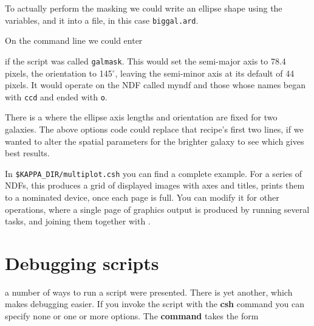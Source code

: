\documentclass[twoside,11pt,nolof]{starlink}
\providecommand{\dgs}{\hbox{$^\circ$}}
\providecommand{\PSMERGEref}{\xref{{\footnotesize PSMERGE}}{sun164}{}}
\begin{document}
To actually perform the masking we could write an  ellipse shape using the variables, and
 it into a
file, in this case \texttt{biggal.ard}.

\begin{small}
\end{small}

On the command line we could enter

\begin{small}
\begin{terminalv}
\end{terminalv}
\end{small}
if the script was called \texttt{galmask}.  This would set the semi-major
axis to 78.4 pixels, the orientation to 145\dgs, leaving the
semi-minor axis at its default of 44 pixels.  It would operate on
the NDF called myndf and those whose names began with \texttt{ccd} and
ended with \texttt{o}.

There is a   where the ellipse axis lengths and
orientation are fixed for two galaxies.  The above options code could
replace that recipe's first two lines, if we wanted to alter the
spatial parameters for the brighter galaxy to see which gives best
results.

In \texttt{\$KAPPA\_DIR/multiplot.csh} you can find a complete example.
For a series of NDFs, this produces a grid of displayed images with
axes and titles, prints them to a nominated device, once each page is
full.  You can modify it for other operations, where a single page of
graphics output is produced by running several tasks, and joining them
together with \PSMERGEref\latex{ (SUN/164)}.

\newpage
\section{Debugging scripts
\label{sc4_se_debugging}}

  a number of ways to run a
script were presented.  There is yet another, which makes debugging
easier.  If you invoke the script with the \textbf{csh} command you can
specify none or one or more options.  The \textbf{command} takes the form
\end{document}
